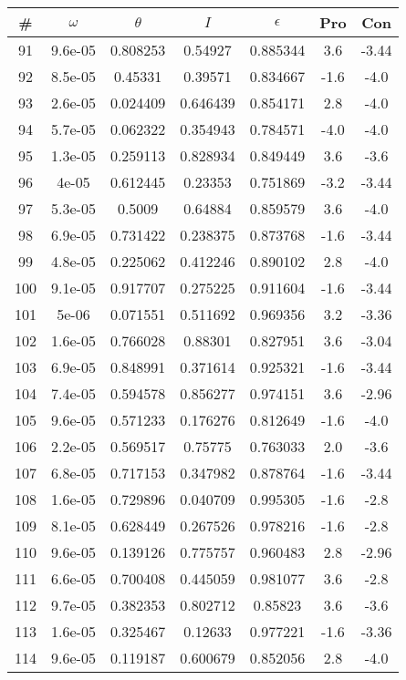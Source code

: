 \begin{table}
\begin{tabular}{c|c|c|c|c|c|c}
\# & $\omega$ & $\theta$ & $I$ & $\epsilon$ & Pro & Con\\
\hline
91 & 9.6e-05 & 0.808253 & 0.54927 & 0.885344 & 3.6 & -3.44\\
92 & 8.5e-05 & 0.45331 & 0.39571 & 0.834667 & -1.6 & -4.0\\
93 & 2.6e-05 & 0.024409 & 0.646439 & 0.854171 & 2.8 & -4.0\\
94 & 5.7e-05 & 0.062322 & 0.354943 & 0.784571 & -4.0 & -4.0\\
95 & 1.3e-05 & 0.259113 & 0.828934 & 0.849449 & 3.6 & -3.6\\
96 & 4e-05 & 0.612445 & 0.23353 & 0.751869 & -3.2 & -3.44\\
97 & 5.3e-05 & 0.5009 & 0.64884 & 0.859579 & 3.6 & -4.0\\
98 & 6.9e-05 & 0.731422 & 0.238375 & 0.873768 & -1.6 & -3.44\\
99 & 4.8e-05 & 0.225062 & 0.412246 & 0.890102 & 2.8 & -4.0\\
100 & 9.1e-05 & 0.917707 & 0.275225 & 0.911604 & -1.6 & -3.44\\
101 & 5e-06 & 0.071551 & 0.511692 & 0.969356 & 3.2 & -3.36\\
102 & 1.6e-05 & 0.766028 & 0.88301 & 0.827951 & 3.6 & -3.04\\
103 & 6.9e-05 & 0.848991 & 0.371614 & 0.925321 & -1.6 & -3.44\\
104 & 7.4e-05 & 0.594578 & 0.856277 & 0.974151 & 3.6 & -2.96\\
105 & 9.6e-05 & 0.571233 & 0.176276 & 0.812649 & -1.6 & -4.0\\
106 & 2.2e-05 & 0.569517 & 0.75775 & 0.763033 & 2.0 & -3.6\\
107 & 6.8e-05 & 0.717153 & 0.347982 & 0.878764 & -1.6 & -3.44\\
108 & 1.6e-05 & 0.729896 & 0.040709 & 0.995305 & -1.6 & -2.8\\
109 & 8.1e-05 & 0.628449 & 0.267526 & 0.978216 & -1.6 & -2.8\\
110 & 9.6e-05 & 0.139126 & 0.775757 & 0.960483 & 2.8 & -2.96\\
111 & 6.6e-05 & 0.700408 & 0.445059 & 0.981077 & 3.6 & -2.8\\
112 & 9.7e-05 & 0.382353 & 0.802712 & 0.85823 & 3.6 & -3.6\\
113 & 1.6e-05 & 0.325467 & 0.12633 & 0.977221 & -1.6 & -3.36\\
114 & 9.6e-05 & 0.119187 & 0.600679 & 0.852056 & 2.8 & -4.0\\

\end{tabular}
\end{table}
